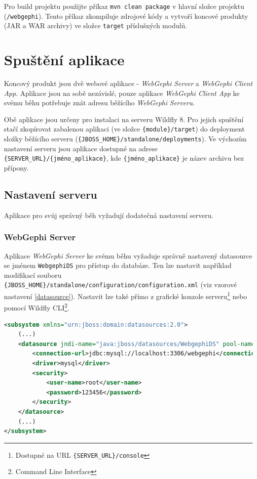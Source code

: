 \documentclass[thesis=M,czech]{FITthesis}[2014/05/6]
\begin{document}
Pro build projektu použijte příkaz \texttt{mvn clean package} v hlavní složce projektu (\texttt{/webgephi}). Tento příkaz zkompiluje zdrojové kódy a vytvoří 
koncové produkty (JAR a WAR archivy) ve složce \texttt{target} příslušných modulů.

\section{Spuštění aplikace}
Koncový produkt jsou dvě webové aplikace - \textit{WebGephi Server} a \textit{WebGephi Client App}. Aplikace jsou na sobě nezávislé, pouze aplikace \textit{WebGephi Client App}
ke svému běhu potřebuje znát adresu běžícího \textit{WebGephi Serveru}. 

Obě aplikace jsou určeny pro instalaci na serveru Wildfly 8\cite{wildfly}. Pro jejich spuštění stačí zkopírovat zabalenou aplikaci (ve složce \texttt{\{module\}/target}) do deployment složky 
běžícího serveru (\texttt{\{JBOSS\_HOME\}/\-standalone/\-deployments}). Ve výchozím nastavení serveru jsou aplikace dostupné na adrese \texttt{\{SERVER\_URL\}/\-\{jméno\_aplikace\}}, kde 
\texttt{\{jméno\_aplikace\}} je název archivu bez přípony.

\subsection{Nastavení serveru}
Aplikace pro svůj správný běh vyžadují dodatečná nastavení serveru.

\subsubsection{WebGephi Server}
Aplikace \textit{WebGephi Server} ke svému běhu vyžaduje správně nastavený datasource se jménem \texttt{WebgephiDS} pro přístup do databáze. Ten lze nastavit například modifikací souboru 
\texttt{\{JBOSS\_HOME\}/\-standalone/\-configuration/\-configuration.xml} (viz vzorové nastavení \ref{datasource}). Nastavit lze také přímo z grafické konzole serveru\footnote{Dostupné na URL
\texttt{\{SERVER\_URL\}/console}} nebo pomocí Wildfly CLI\footnote{Command Line Interface}.

\begin{lstlisting}[caption=Nastavení databázového datasource pro \textit{WebGephi Server}, label=datasource, language=xml]
<subsystem xmlns="urn:jboss:domain:datasources:2.0">
	(...)
	<datasource jndi-name="java:jboss/datasources/WebgephiDS" pool-name="WebgephiDS" enabled="true" use-java-context="true">
	    <connection-url>jdbc:mysql://localhost:3306/webgephi</connection-url>
	    <driver>mysql</driver>
	    <security>
	        <user-name>root</user-name>
	        <password>123456</password>
	    </security>
	</datasource>
	(...)
</subsystem>
\end{lstlisting} 
\end{document}
